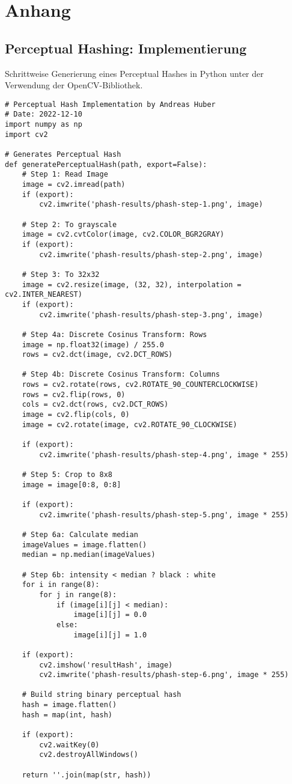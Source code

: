 \appendix
\section*{Anhang}

\subsection*{Perceptual Hashing: Implementierung}
\noindent
Schrittweise Generierung eines Perceptual Hashes in Python unter der Verwendung
der OpenCV-Bibliothek.

\begin{lstlisting}[style=Python]
# Perceptual Hash Implementation by Andreas Huber
# Date: 2022-12-10
import numpy as np
import cv2

# Generates Perceptual Hash
def generatePerceptualHash(path, export=False):
    # Step 1: Read Image
    image = cv2.imread(path)
    if (export):
        cv2.imwrite('phash-results/phash-step-1.png', image)

    # Step 2: To grayscale	
    image = cv2.cvtColor(image, cv2.COLOR_BGR2GRAY)
    if (export):
        cv2.imwrite('phash-results/phash-step-2.png', image)

    # Step 3: To 32x32
    image = cv2.resize(image, (32, 32), interpolation = cv2.INTER_NEAREST)
    if (export):
        cv2.imwrite('phash-results/phash-step-3.png', image)

    # Step 4a: Discrete Cosinus Transform: Rows
    image = np.float32(image) / 255.0
    rows = cv2.dct(image, cv2.DCT_ROWS)
    
    # Step 4b: Discrete Cosinus Transform: Columns
    rows = cv2.rotate(rows, cv2.ROTATE_90_COUNTERCLOCKWISE)
    rows = cv2.flip(rows, 0)
    cols = cv2.dct(rows, cv2.DCT_ROWS)
    image = cv2.flip(cols, 0)
    image = cv2.rotate(image, cv2.ROTATE_90_CLOCKWISE)

    if (export):
        cv2.imwrite('phash-results/phash-step-4.png', image * 255)

    # Step 5: Crop to 8x8
    image = image[0:8, 0:8]

    if (export):
        cv2.imwrite('phash-results/phash-step-5.png', image * 255)

    # Step 6a: Calculate median
    imageValues = image.flatten()
    median = np.median(imageValues)

    # Step 6b: intensity < median ? black : white
    for i in range(8):
        for j in range(8):
            if (image[i][j] < median):
                image[i][j] = 0.0
            else:
                image[i][j] = 1.0

    if (export):
        cv2.imshow('resultHash', image)
        cv2.imwrite('phash-results/phash-step-6.png', image * 255)

    # Build string binary perceptual hash
    hash = image.flatten()
    hash = map(int, hash)

    if (export):
        cv2.waitKey(0)
        cv2.destroyAllWindows()

    return ''.join(map(str, hash))
\end{lstlisting}